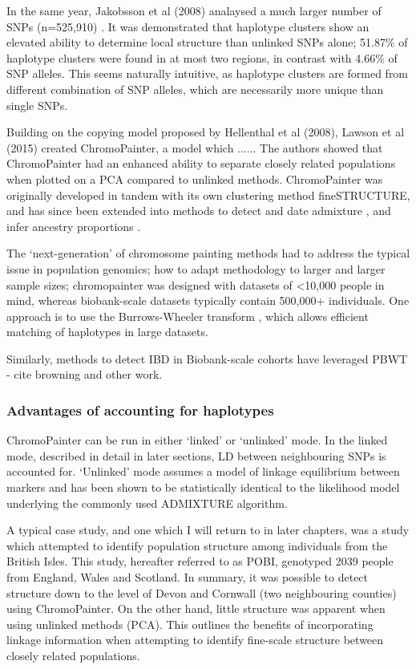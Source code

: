 In the same year, Jakobsson et al (2008) analaysed a much larger number of SNPs (n=525,910) \cite{jakobsson2008genotype}. It was demonstrated that haplotype clusters show an elevated ability to determine local structure than unlinked SNPs alone;  51.87\% of haplotype clusters were found in at most two regions, in contrast with 4.66\% of SNP alleles. This seems naturally intuitive, as haplotype clusters are formed from different combination of SNP alleles, which are necessarily more unique than single SNPs. 


Building on the copying model proposed by Hellenthal et al (2008), Lawson et al (2015) \cite{Lawson2012} created ChromoPainter, a model which ...... The authors showed that ChromoPainter had an enhanced ability to separate closely related populations when plotted on a PCA compared to unlinked methods. ChromoPainter was originally developed in tandem with its own clustering method fineSTRUCTURE, and has since been extended into methods to detect and date admixture \cite{Hellenthal2014}, and infer ancestry proportions \cite{Chacon-Duque2018}. 

The `next-generation' of chromosome painting methods had to address the typical issue in population genomics; how to adapt methodology to larger and larger sample sizes; chromopainter was designed with datasets of <10,000 people in mind, whereas biobank-scale datasets typically contain 500,000+ individuals. One approach is to use the Burrows-Wheeler transform \cite{burrows1994block, DurbinPBWT}, which allows efficient matching of haplotypes in large datasets.

Similarly, methods to detect IBD in Biobank-scale cohorts have leveraged PBWT - cite browning and other work. 

\subsubsection{Advantages of accounting for haplotypes}

ChromoPainter can be run in either `linked' or `unlinked' mode. In the linked mode, described in detail in later sections, LD between neighbouring SNPs is accounted for. `Unlinked' mode assumes a model of linkage equilibrium between markers and has been shown to be statistically identical to the likelihood model underlying the commonly used ADMIXTURE algorithm. 

A typical case study, and one which I will return to in later chapters, was a study which attempted to identify population structure among individuals from the British Isles. This study, hereafter referred to as POBI, genotyped 2039 people from England, Wales and Scotland. In summary, it was possible to detect structure down to the level of Devon and Cornwall (two neighbouring counties) using ChromoPainter. On the other hand, little structure was apparent when using unlinked methods (PCA). This outlines the benefits of incorporating linkage information when attempting to identify fine-scale structure between closely related populations.

